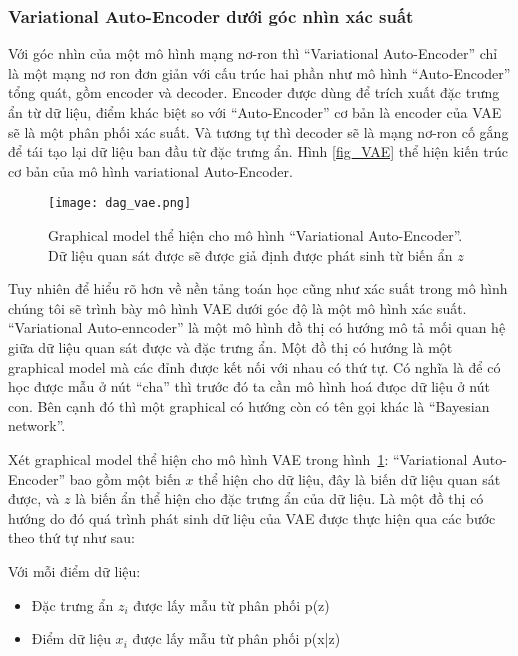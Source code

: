        \subsubsection{Variational Auto-Encoder dưới góc nhìn xác suất}
        Với góc nhìn của một mô hình mạng nơ-ron thì ``Variational Auto-Encoder'' chỉ là một mạng nơ ron đơn giản với cấu trúc hai phần như mô hình ``Auto-Encoder'' tổng quát, gồm encoder và decoder. 
        Encoder được dùng để trích xuất đặc trưng ẩn từ dữ liệu, điểm khác biệt so với ``Auto-Encoder'' cơ bản là encoder của VAE sẽ là một phân phối xác suất.
        Và tương tự thì decoder sẽ là mạng nơ-ron cố gắng để tái tạo lại dữ liệu ban đầu từ đặc trưng ẩn.
        Hình \ref{fig_VAE} thể hiện kiến trúc cơ bản của mô hình variational Auto-Encoder.


        \begin{figure}
            \centering
            \texttt{[image: dag\_vae.png]}
            \caption[Graphical model thể hiện cho mô hình ``Variational Auto-Encoder'']{Graphical model thể hiện cho mô hình ``Variational Auto-Encoder''. Dữ liệu quan sát được sẽ được giả định được phát sinh từ biến ẩn $z$} 
            \label{fig_dag_vae}
        \end{figure}

        Tuy nhiên để hiểu rõ hơn về nền tảng toán học cũng như xác suất trong mô hình chúng tôi sẽ trình bày mô hình VAE dưới góc độ là một mô hình xác suất.
        ``Variational Auto-enncoder'' là một mô hình đồ thị có hướng mô tả mối quan hệ giữa dữ liệu quan sát được và đặc trưng ẩn. Một đồ thị có hướng là một graphical model mà các đỉnh được kết nối với nhau có thứ tự. Có nghĩa là để có học được mẫu ở nút ``cha'' thì trước đó ta cần mô hình hoá đưọc dữ liệu ở nút con. Bên cạnh đó thì một graphical có hướng còn có tên gọi khác là ``Bayesian network''.
 
        
        Xét graphical model thể hiện cho mô hình VAE trong hình~\ref{fig_dag_vae}:
        ``Variational Auto-Encoder'' bao gồm một biến $x$ thể hiện cho dữ liệu, đây là biến dữ liệu quan sát được, và $z$ là biến ẩn thể hiện cho đặc trưng ẩn của dữ liệu. 
        Là một đồ thị có hướng do đó quá trình phát sinh dữ liệu của VAE được thực hiện qua các bước theo thứ tự như sau: 
        
        Với mỗi điểm dữ liệu: 
        \begin{itemize}
            \item Đặc trưng ẩn $z_i$ được lấy mẫu từ phân phối p(z)
            \item Điểm dữ liệu $x_i$ được lấy mẫu từ phân phối p(x|z)
        \end{itemize}

